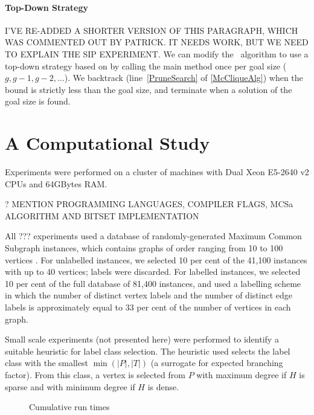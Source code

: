 \documentclass[letterpaper]{article}
\newcommand{\citet}[1]{\citeauthor{#1} \shortcite{#1}}
\newcommand{\McSplit}{\textproc{McSplit}}
\newcommand{\lineref}[1]{line~\ref{#1}}
\begin{document}
\paragraph{Top-Down Strategy} I'VE RE-ADDED A SHORTER VERSION OF THIS
PARAGRAPH, WHICH WAS COMMENTED OUT BY PATRICK. IT NEEDS WORK, BUT WE NEED TO
EXPLAIN THE SIP EXPERIMENT. We can modify the \McSplit\ algorithm to use a
top-down strategy based on \citet{UpcomingAAAIPaper} by calling the main
 method once per goal size ($g, g-1, g-2, \dots$).  We
backtrack (\lineref{PruneSearch} of \cref{McCliqueAlg}) when the bound is
strictly less than the goal size, and terminate when a solution of the goal
size is found.

\section{A Computational Study}

Experiments were performed on a cluster of machines with Dual Xeon E5-2640
v2 CPUs and 64GBytes RAM.

? MENTION PROGRAMMING LANGUAGES, COMPILER FLAGS, MCSa ALGORITHM AND
BITSET IMPLEMENTATION

All ??? experiments used a database of
randomly-generated Maximum Common Subgraph instances, which contains graphs of
order ranging from 10 to 100 vertices
\cite{DBLP:journals/prl/SantoFSV03,DBLP:journals/jgaa/ConteFV07}.  For
unlabelled instances, we selected 10 per cent of the 41,100 instances with up
to 40 vertices; labels were discarded. For labelled instances, we selected 10
per cent of the full database of 81,400 instances, and used a labelling scheme
in which the number of distinct vertex labels and the number of distinct edge
labels is approximately equal to 33 per cent of the number of vertices in each
graph.

Small scale experiments (not presented here) were performed to identify a
suitable heuristic for label class selection. The heuristic used selects the
label class  with the smallest $\min(|P|,|T|)$ (a surrogate for expected
branching factor). From this class, a vertex is selected from $P$ with maximum
degree if $H$ is sparse and with minimum degree if $H$ is dense. 

\begin{figure}[h]
    \centering

    \caption{Cumulative run times}\label{figure:mcs-cumulative}
\end{figure}
\end{document}
